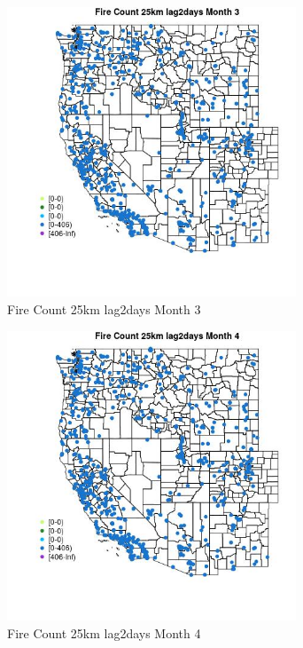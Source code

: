 \begin{figure} 
\centering  
\includegraphics[width=0.77\textwidth]{Code_Outputs/Report_ML_input_PM25_Step4_part_f_de_duplicated_aves_prioritize_24hr_obswNAs_MapObsMo3Fire_Count_25km_lag2days.jpg} 
\caption{\label{fig:Report_ML_input_PM25_Step4_part_f_de_duplicated_aves_prioritize_24hr_obswNAsMapObsMo3Fire_Count_25km_lag2days}Fire Count 25km lag2days Month 3} 
\end{figure} 
 

\begin{figure} 
\centering  
\includegraphics[width=0.77\textwidth]{Code_Outputs/Report_ML_input_PM25_Step4_part_f_de_duplicated_aves_prioritize_24hr_obswNAs_MapObsMo4Fire_Count_25km_lag2days.jpg} 
\caption{\label{fig:Report_ML_input_PM25_Step4_part_f_de_duplicated_aves_prioritize_24hr_obswNAsMapObsMo4Fire_Count_25km_lag2days}Fire Count 25km lag2days Month 4} 
\end{figure} 
 

